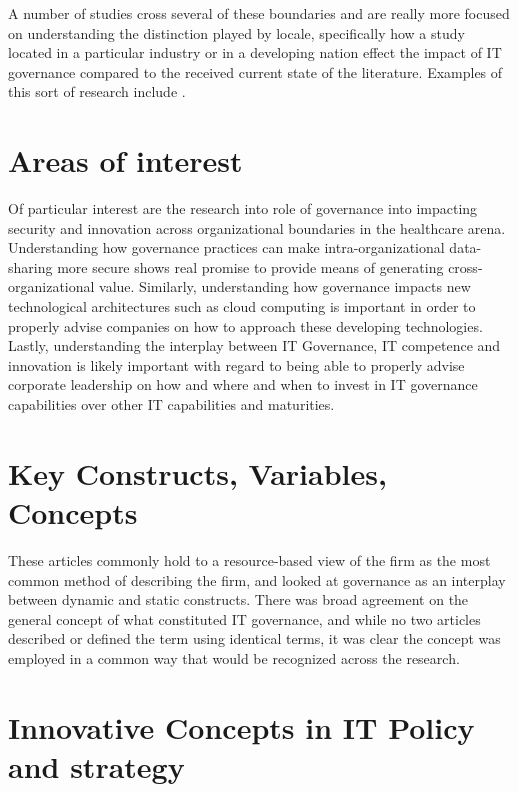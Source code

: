 \documentclass[stu]{apa7}
\begin{document}
A number of studies cross several of these boundaries and are really more focused on understanding the distinction played by locale, specifically how a study located in a particular industry or in a developing nation effect the impact of IT governance compared to the received current state of the literature. Examples of this sort of research include \parencite{hamdanITGovernanceFirm2019,mallmannAdoptionCloudComputing2018,kizitoInquiryITGovernance2019}.

\section{Areas of interest}
\label{sec:org859d735}

Of particular interest are the research into role of governance into impacting security and innovation across organizational boundaries in the healthcare arena. Understanding how governance practices can make intra-organizational data-sharing more secure \parencite{zhangDoesSharingMake2019} shows real promise to provide means of generating cross-organizational value. Similarly, understanding how governance impacts new technological architectures such as cloud computing \parencite{mallmannAdoptionCloudComputing2018} is important in order to properly advise companies on how to approach these developing technologies. Lastly, understanding the interplay between IT Governance, IT competence and innovation \parencite{herouxModeratingRoleITbusiness2018} is likely important with regard to being able to properly advise corporate leadership on how and where and when to invest in IT governance capabilities over other IT capabilities and maturities.

\section{Key Constructs, Variables, Concepts}
\label{sec:org54afc5b}

These articles commonly hold to a resource-based view of the firm as the most common method of describing the firm, and looked at governance as an interplay between dynamic and static constructs. There was broad agreement on the general concept of what constituted IT governance, and while no two articles described or defined the term using identical terms, it was clear the concept was employed in a common way that would be recognized across the research.

\section{Innovative Concepts in IT Policy and strategy}
\label{sec:org179ae63}
\end{document}
